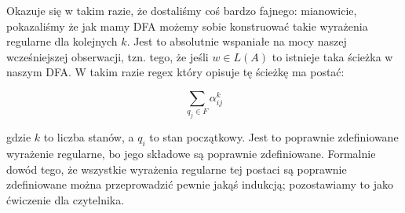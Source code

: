     Okazuje się w takim razie, że dostaliśmy coś bardzo fajnego: mianowicie, pokazaliśmy że jak mamy DFA możemy sobie konstruować takie wyrażenia regularne dla kolejnych \(k\). Jest to absolutnie wspaniałe na mocy naszej wcześniejszej obserwacji, tzn. tego, że jeśli \(w \in L(A) \) to istnieje taka ścieżka w naszym DFA. W takim razie regex który opisuje tę ścieżkę ma postać:
    
    \[
        \sum_{q_j \in F} \alpha^{k}_{ij}
    \]
    
    gdzie \(k\) to liczba stanów, a \(q_i\) to stan początkowy. Jest to poprawnie zdefiniowane wyrażenie regularne, bo jego składowe są poprawnie zdefiniowane. Formalnie dowód tego, że wszystkie wyrażenia regularne tej postaci są poprawnie zdefiniowane można przeprowadzić pewnie jakąś indukcją; pozostawiamy to jako ćwiczenie dla czytelnika.
